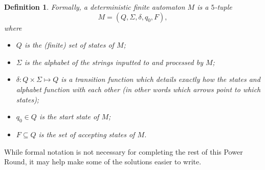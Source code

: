 \documentclass[11pt]{article}
\newtheorem{defn}{Definition}[section]
\begin{document}
\begin{defn}
Formally, a deterministic finite automaton $M$ is a $5$-tuple \[M=(Q,\Sigma,\delta, q_0, F),\] where

\begin{itemize}

\item $Q$ is the (finite) set of states of $M$;

\item $\Sigma$ is the alphabet of the strings inputted to and processed by $M$;

\item $\delta:Q\times\Sigma\mapsto Q$ is a transition function which details exactly how the states and alphabet function with each other (in other words which arrows point to which states);

\item $q_0\in Q$ is the start state of $M$;

\item $F\subseteq Q$ is the set of accepting states of $M$.

\end{itemize}

\end{defn}

\par While formal notation is not necessary for completing the rest of this Power Round, it may help make some of the solutions easier to write.
\end{document}
